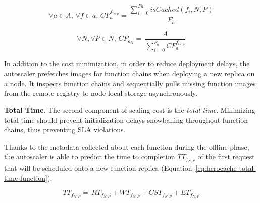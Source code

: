 \begin{equation}
    \forall a \in A, \, \forall f \in a, \, CF_{a}^{{f}_{i_{N, P}}} = \frac{\sum_{i = 0}^{Fa} isCached(f_{i}, N, P)}{F_{a}}
\label{eq:herocache-cached-functions}
\end{equation}

\begin{equation}
    \forall N, \forall P \in N, \, {CP}_{{a}_{N}} = \, \frac{A}{\sum_{i = 0}^{F_{a}} CF_{a}^{{f}_{i_{N, P}}}}
\label{eq:herocache-cache-proportion-app}
\end{equation}

In addition to the cost minimization, in order to reduce deployment delays, the autoscaler prefetches images for function chains when deploying a new replica on a node. It inspects function chains and sequentially pulls missing function images from the remote registry to node-local storage asynchronously. %

\textbf{Total Time}. The second component of scaling cost is the \textit{total time}. Minimizing total time should prevent initialization delays snowballing throughout function chains, thus preventing SLA violations.

Thanks to the metadata collected about each function during the offline phase, the autoscaler is able to predict the time to completion $ {TT}_{{f}_{N, P}}$ of the first request that will be scheduled onto a new function replica (Equation~\ref{eq:herocache-total-time-function}).

\begin{equation}
    {TT}_{{f}_{N, P}} = \, {RT}_{{f}_{N, P}} + {WT}_{{f}_{N, P}} + {CST}_{{f}_{N, P}} + {ET}_{{f}_{N, P}}
\label{eq:herocache-total-time-function}
\end{equation}

